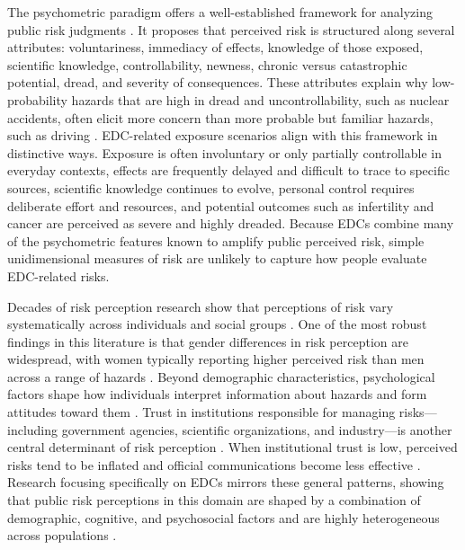 The psychometric paradigm offers a well-established framework for analyzing public risk judgments \citep{slovic1987perception, fischhoff1978safe}. It proposes that perceived risk is structured along several attributes: voluntariness, immediacy of effects, knowledge of those exposed, scientific knowledge, controllability, newness, chronic versus catastrophic potential, dread, and severity of consequences. These attributes explain why low-probability hazards that are high in dread and uncontrollability, such as nuclear accidents, often elicit more concern than more probable but familiar hazards, such as driving \citep{slovic2012perception}. EDC-related exposure scenarios align with this framework in distinctive ways. Exposure is often involuntary or only partially controllable in everyday contexts, effects are frequently delayed and difficult to trace to specific sources, scientific knowledge continues to evolve, personal control requires deliberate effort and resources, and potential outcomes such as infertility and cancer are perceived as severe and highly dreaded. Because EDCs combine many of the psychometric features known to amplify public perceived risk, simple unidimensional measures of risk are unlikely to capture how people evaluate EDC-related risks.

Decades of risk perception research show that perceptions of risk vary systematically across individuals and social groups \citep{gustafsod1998gender}. One of the most robust findings in this literature is that gender differences in risk perception are widespread, with women typically reporting higher perceived risk than men across a range of hazards \citep{finucane2013gender}. Beyond demographic characteristics, psychological factors shape how individuals interpret information about hazards and form attitudes toward them \citep{jenkins2024integrative}. Trust in institutions responsible for managing risks---including government agencies, scientific organizations, and industry---is another central determinant of risk perception \citep{siegrist2000perception, siegrist2021trust}. When institutional trust is low, perceived risks tend to be inflated and official communications become less effective \citep{siegrist2008factors,slovic1993perceived}. Research focusing specifically on EDCs mirrors these general patterns, showing that public risk perceptions in this domain are shaped by a combination of demographic, cognitive, and psychosocial factors and are highly heterogeneous across populations \citep{pravednikov2024main}.

